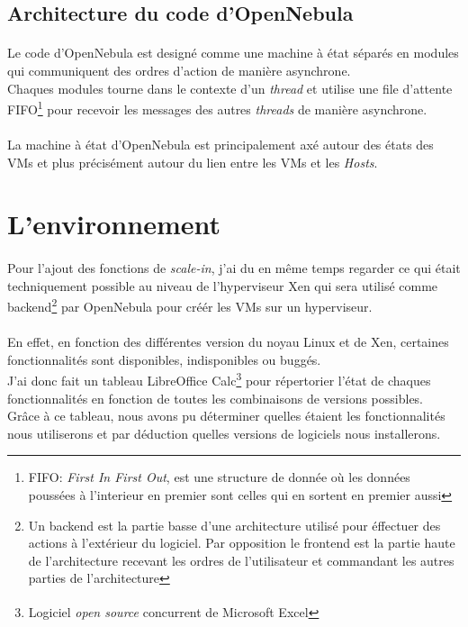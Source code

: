 \subsection{Architecture du code d'OpenNebula}
\paragraph*{}
Le code d'OpenNebula est designé comme une machine à état séparés en modules qui communiquent des ordres d'action de manière asynchrone.
\\
Chaques modules tourne dans le contexte d'un \emph{thread} et utilise une file d'attente FIFO\footnote{FIFO: \emph{First In First Out}, est une structure de donnée où les données poussées à l'interieur
en premier sont celles qui en sortent en premier aussi} pour recevoir les messages des autres \emph{threads} de manière asynchrone.

\paragraph*{}
La machine à état d'OpenNebula est principalement axé autour des états des VMs et plus précisément autour du lien entre les VMs et les \emph{Hosts}.


\section{L'environnement}

\paragraph*{}
Pour l'ajout des fonctions de \emph{scale-in}, j'ai du en même temps regarder ce qui était techniquement possible au niveau de l'hyperviseur Xen qui
sera utilisé comme backend\footnote{Un backend est la partie basse d'une architecture utilisé pour éffectuer des actions à l'extérieur du logiciel.
Par opposition le frontend est la partie haute de l'architecture recevant les ordres de l'utilisateur et commandant les autres parties de l'architecture}
par OpenNebula pour créér les VMs sur un hyperviseur.

\paragraph*{}
En effet, en fonction des différentes version du noyau Linux et de Xen, certaines fonctionnalités sont disponibles, indisponibles ou buggés.\\
J'ai donc fait un tableau LibreOffice Calc\footnote{Logiciel \emph{open source} concurrent de Microsoft\textsuperscript{\textregistered} Excel\texttrademark}
pour répertorier l'état de chaques fonctionnalités en fonction de toutes les combinaisons de versions possibles.
\\
Grâce à ce tableau, nous avons pu déterminer quelles étaient les fonctionnalités nous utiliserons et par déduction quelles versions de logiciels nous
installerons.

